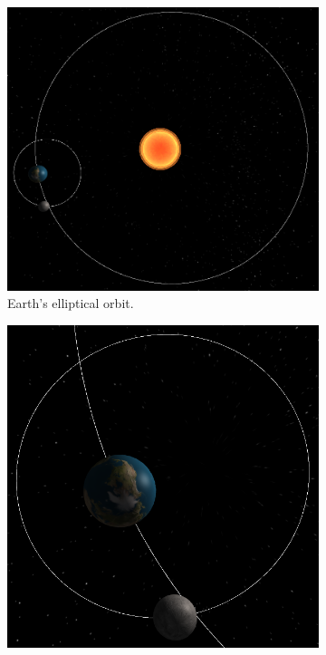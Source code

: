 \documentclass[12pt]{article}
\begin{document}
 \begin{figure}[H]
        \centering
        \begin{subfigure}[b]{0.4\textwidth}
                \includegraphics[width=\textwidth]{images/earthelliptical}
                \caption{Earth's elliptical orbit.}
                \label{fig: Earth's elliptical orbit.}
	 \end{subfigure}
        \begin{subfigure}[b]{0.4\textwidth}
                \includegraphics[width=\textwidth]{images/moonelliptical}

\end{subfigure}
\end{figure}
\end{document}
